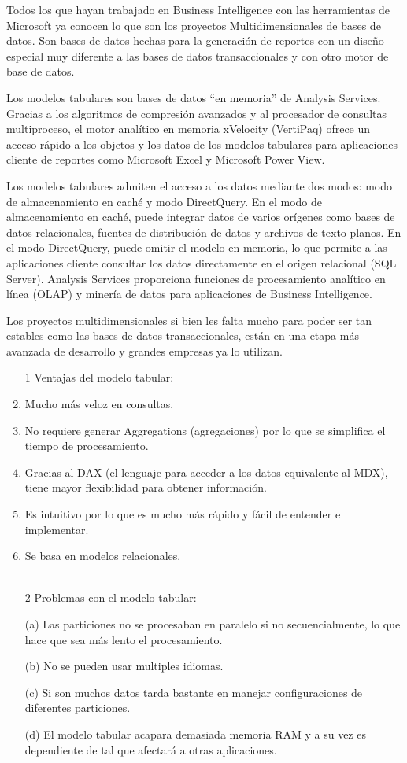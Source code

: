 \documentclass[twoside,twocolumn]{article}
\begin{document}
\begin{enumerate}
Todos los que hayan trabajado en Business Intelligence con las herramientas de Microsoft ya conocen lo que son los proyectos Multidimensionales de bases de datos. Son bases de datos hechas para la generación de reportes con un diseño especial muy diferente a las bases de datos transaccionales y con otro motor de base de datos.

Los modelos tabulares son bases de datos “en memoria” de Analysis Services. Gracias a los algoritmos de compresión avanzados y al procesador de consultas multiproceso, el motor analítico en memoria xVelocity (VertiPaq) ofrece un acceso rápido a los objetos y los datos de los modelos tabulares para aplicaciones cliente de reportes como Microsoft Excel y Microsoft Power View.

Los modelos tabulares admiten el acceso a los datos mediante dos modos: modo de almacenamiento en caché y modo DirectQuery. En el modo de almacenamiento en caché, puede integrar datos de varios orígenes como bases de datos relacionales, fuentes de distribución de datos y archivos de texto planos. En el modo DirectQuery, puede omitir el modelo en memoria, lo que permite a las aplicaciones cliente consultar los datos directamente en el origen relacional (SQL Server).
Analysis Services proporciona funciones de procesamiento analítico en línea (OLAP) y minería de datos para aplicaciones de Business Intelligence.

Los proyectos multidimensionales si bien les falta mucho para poder ser tan estables como las bases de datos transaccionales, están en una etapa más avanzada de desarrollo y grandes empresas ya lo utilizan.


\begin{enumerate}
\item[1] Ventajas del modelo tabular:\\ 
\item Mucho más veloz en consultas.
\item No requiere generar Aggregations (agregaciones) por lo que se simplifica el tiempo de procesamiento.
\item Gracias al DAX (el lenguaje para acceder a los datos equivalente al MDX), tiene mayor flexibilidad para obtener información.
\item Es intuitivo por lo que es mucho más rápido y fácil de entender e implementar.
\item Se basa en modelos relacionales.\\ \\ 


\item[2] Problemas con el modelo tabular: \\ 
\item[(a)] Las particiones no se procesaban en paralelo si no secuencialmente, lo que hace que sea más lento el procesamiento.
\item[(b)]No se pueden usar multiples idiomas.
\item[(c)]Si son muchos datos tarda bastante en manejar configuraciones de diferentes particiones.
\item[(d)]El modelo tabular acapara demasiada memoria RAM y a su vez es dependiente de tal que afectará a otras aplicaciones.


\end{enumerate}
\end{enumerate}
\end{document}
